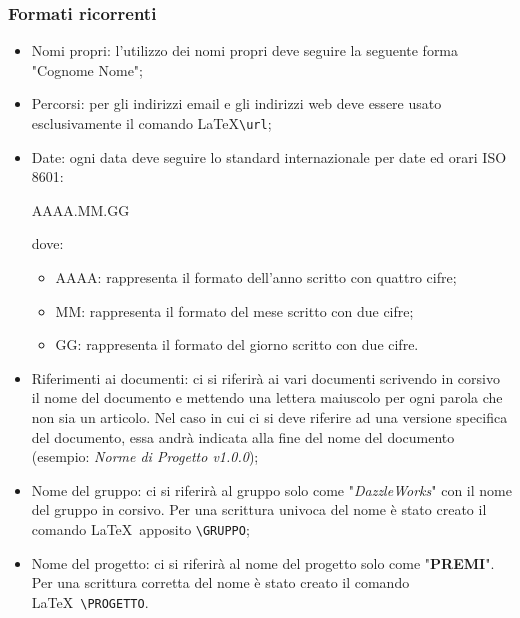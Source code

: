 \subsubsection{Formati ricorrenti}
\begin{itemize}
	\item Nomi propri: l'utilizzo dei nomi propri deve seguire la seguente forma "Cognome Nome";
	\item Percorsi: per gli indirizzi email e gli indirizzi web deve essere usato esclusivamente il comando \LaTeX  \verb|\url|;
	\item Date:  ogni data deve seguire lo standard internazionale per date ed orari ISO 8601:
	\begin{center}
		AAAA.MM.GG
	\end{center}
	dove:
	\begin{itemize}
		\item AAAA: rappresenta il formato dell'anno scritto con quattro cifre;
		\item MM: rappresenta il formato del mese scritto con due cifre;
		\item GG: rappresenta il formato del giorno scritto con due cifre.
	\end{itemize}
	\item Riferimenti ai documenti: ci si riferirà ai vari documenti scrivendo in corsivo il nome del documento e mettendo una lettera maiuscolo per ogni parola che non sia un articolo. Nel caso in cui ci si deve riferire ad una versione specifica del documento, essa andrà indicata alla fine  del nome del documento (esempio: \textit{Norme di Progetto v1.0.0});
	\item Nome del gruppo: ci si riferirà al gruppo solo come "\textit{DazzleWorks}" con il nome del gruppo in corsivo. Per una scrittura univoca del nome è stato creato il comando \LaTeX\ apposito \verb|\GRUPPO|;
	\item Nome del progetto: ci si riferirà al nome del progetto solo come "\textbf{PREMI}". Per una scrittura corretta del nome è stato creato il comando \LaTeX\ \verb|\PROGETTO|.
\end{itemize}

